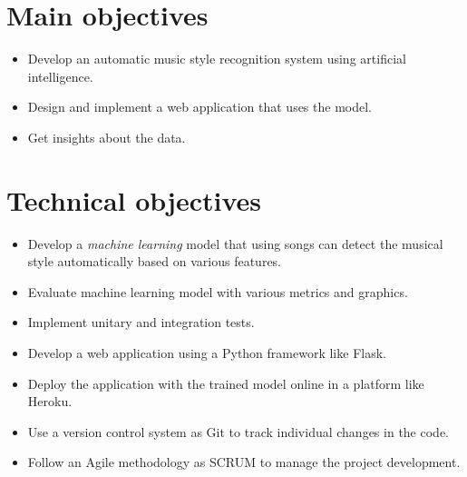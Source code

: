 
\section{Main objectives}
\begin{itemize}
\tightlist
\item Develop an automatic music style recognition system using artificial intelligence.
\item Design and implement a web application that uses the model.
\item Get insights about the data.
\end{itemize}

\section{Technical objectives}
\begin{itemize}
\tightlist
\item Develop a \textit{machine learning} model that using songs can detect the musical style automatically based on various features.
\item Evaluate machine learning model with various metrics and graphics.
\item Implement unitary and integration tests.
\item Develop a web application using a Python framework like Flask.
\item Deploy the application with the trained model online in a platform like Heroku.
\item Use a version control system as Git to track individual changes in the code.
\item Follow an Agile methodology as SCRUM to manage the project development.
\end{itemize}